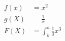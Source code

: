 \documentclass{article}
\begin{document}
	\begin{align*}
	f(x) &= x^2\\
	g(X) &= \frac{1}{x}\\
	F(X) &= \int^a_b
	\frac{1}{3}x^3
	\end{align*}
\end{document}
